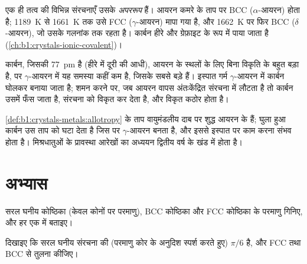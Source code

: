 \begin{definition}[अपररूपता]\label{def:b1:crystals-metals:allotropy}
एक ही तत्व की विभिन्न  संरचनाएँ उसके
\emph{अपररूप} हैं। आयरन कमरे के ताप पर BCC ($\alpha$-आयरन)
होता है; \qty{1189}{K} से \qty{1661}{K} तक उसे FCC ($\gamma$-आयरन) मापा गया है,
और \qty{1662}{K} पर फिर BCC ($\delta$-आयरन), जो उसके
गलनांक तक रहता है। कार्बन हीरे और ग्रेफ़ाइट के रूप में पाया जाता है
(\cref{ch:b1:crystals-ionic-covalent})।
\end{definition}

\begin{example}[इस्पात]\label{ex:b1:crystals-metals:steel}
कार्बन, जिसकी  \qty{77}{pm} है (हीरे में  दूरी की
आधी), आयरन के स्थलों के लिए बिना विकृति के बहुत बड़ा है, पर
$\gamma$-आयरन में यह समस्या कहीं कम है, जिसके  सबसे बड़े हैं। इस्पात
गर्म $\gamma$-आयरन में कार्बन घोलकर बनाया जाता है; शमन करने पर, जब आयरन
वापस अंतःकेंद्रित संरचना में लौटता है तो कार्बन उसमें फँस जाता है, संरचना को
विकृत कर देता है, और विकृत  कठोर होता है।
\end{example}

\begin{remark}\label{rem:b1:crystals-metals:iron-T}
\cref{def:b1:crystals-metals:allotropy} के ताप वायुमंडलीय दाब पर
शुद्ध आयरन के हैं; घुला हुआ कार्बन उस ताप को घटा देता है
जिस पर $\gamma$-आयरन बनता है, और इससे इस्पात पर काम करना संभव होता है।
मिश्रधातुओं के प्रावस्था आरेखों का अध्ययन द्वितीय वर्ष के खंड में होता है।
\end{remark}

\section{अभ्यास}

\begin{exercise}[$\star$]\label{exo:b1:crystals-metals:1}
सरल घनीय कोष्ठिका (केवल कोनों पर परमाणु), BCC
कोष्ठिका और FCC कोष्ठिका के परमाणु गिनिए, और हर एक में  बताइए।
\end{exercise}

\begin{exercise}[$\star$]\label{exo:b1:crystals-metals:2}
दिखाइए कि सरल घनीय संरचना की  (परमाणु कोर के अनुदिश
स्पर्श करते हुए) $\pi/6$ है, और FCC तथा BCC से तुलना कीजिए।
\end{exercise}

